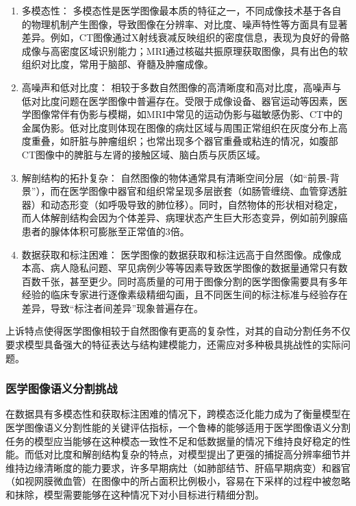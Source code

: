 \begin{enumerate}
    \item 多模态性： 
    多模态性是医学图像最本质的特征之一，不同成像技术基于各自的物理机制产生图像，导致图像在分辨率、对比度、噪声特性等方面具有显著差异。例如，CT图像通过X射线衰减反映组织的密度信息，表现为良好的骨骼成像与高密度区域识别能力；MRI通过核磁共振原理获取图像，具有出色的软组织对比度，常用于脑部、脊髓及肿瘤成像。
    
    \item 高噪声和低对比度：
    相较于多数自然图像的高清晰度和高对比度，高噪声与低对比度问题在医学图像中普遍存在。受限于成像设备、器官运动等因素，医学图像常伴有伪影与模糊，如MRI中常见的运动伪影与磁敏感伪影、CT中的金属伪影。低对比度则体现在图像的病灶区域与周围正常组织在灰度分布上高度重叠，如肝脏与肿瘤组织；也常出现多个器官重叠或粘连的情况，如腹部CT图像中的脾脏与左肾的接触区域、脑白质与灰质区域。
    
    \item 解剖结构的拓扑复杂：
    自然图像的物体通常具有清晰空间分层（如“前景-背景”），而在医学图像中器官和组织常呈现多层嵌套（如肠管缠绕、血管穿透脏器）和动态形变（如呼吸导致的肺位移）。同时，自然物体的形状相对稳定，而人体解剖结构会因为个体差异、病理状态产生巨大形态变异，例如前列腺癌患者的腺体体积可膨胀至正常值的3倍。
    
    \item 数据获取和标注困难：
    医学图像的数据获取和标注远高于自然图像。成像成本高、病人隐私问题、罕见病例少等等因素导致医学图像的数据量通常只有数百数千张，甚至更少。同时高质量的可用于图像分割的医学图像需要具有多年经验的临床专家进行逐像素级精细勾画，且不同医生间的标注标准与经验存在差异，导致“标注者间差异”现象普遍存在。

\end{enumerate}


上诉特点使得医学图像相较于自然图像有更高的复杂性，对其的自动分割任务不仅要求模型具备强大的特征表达与结构建模能力，还需应对多种极具挑战性的实际问题。

\subsubsection{医学图像语义分割挑战}

在数据具有多模态性和获取标注困难的情况下，跨模态泛化能力成为了衡量模型在医学图像语义分割性能的关键评估指标，一个鲁棒的能够适用于医学图像语义分割任务的模型应当能够在这种模态一致性不足和低数据量的情况下维持良好稳定的性能。而低对比度和解剖结构复杂的特点，对模型提出了更强的捕捉高分辨率细节并维持边缘清晰度的能力要求，许多早期病灶（如肺部结节、肝癌早期病变）和器官（如视网膜微血管）在图像中的所占面积比例极小，容易在下采样的过程中被忽略和抹除，模型需要能够在这种情况下对小目标进行精细分割。

